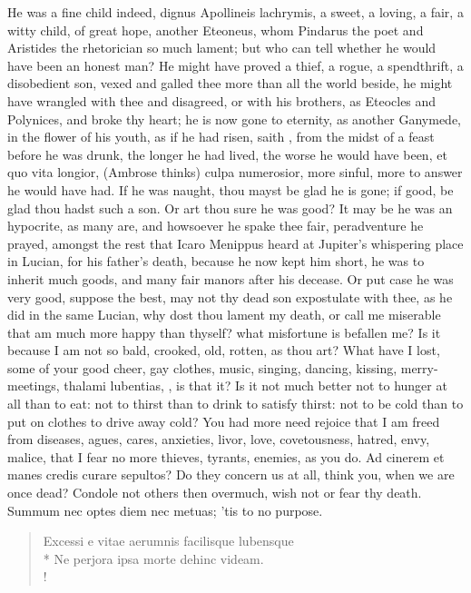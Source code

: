 {He was a fine child indeed, dignus Apollineis lachrymis, a sweet, a
loving, a fair, a witty child, of great hope, another Eteoneus, whom
Pindarus the poet and Aristides the rhetorician so much lament; but who
can tell whether he would have been an honest man? He might have proved
a thief, a rogue, a spendthrift, a disobedient son, vexed and galled
thee more than all the world beside, he might have wrangled with thee
and disagreed, or with his brothers, as Eteocles and Polynices, and
broke thy heart; he is now gone to eternity, as another Ganymede, in
the flower of his youth, as if he had risen, saith
\Plutarch, from the midst of a feast before he was drunk, the
longer he had lived, the worse he would have been, et quo vita longior,
(Ambrose thinks) culpa numerosior, more sinful, more to answer he would
have had. If he was naught, thou mayst be glad he is gone; if good, be
glad thou hadst such a son. Or art thou sure he was good? It may be he
was an hypocrite, as many are, and howsoever he spake thee fair,
peradventure he prayed, amongst the rest that Icaro Menippus heard at
Jupiter's whispering place in Lucian, for his father's death, because
he now kept him short, he was to inherit much goods, and many fair
manors after his decease. Or put case he was very good, suppose the
best, may not thy dead son expostulate with thee, as he did in the same
Lucian, why dost thou lament my death, or call me miserable that
am much more happy than thyself? what misfortune is befallen me? Is it
because I am not so bald, crooked, old, rotten, as thou art? What have
I lost, some of your good cheer, gay clothes, music, singing, dancing,
kissing, merry-meetings, thalami lubentias, \etc{}, is that it? Is it not
much better not to hunger at all than to eat: not to thirst than to
drink to satisfy thirst: not to be cold than to put on clothes to drive
away cold? You had more need rejoice that I am freed from diseases,
agues, cares, anxieties, livor, love, covetousness, hatred, envy,
malice, that I fear no more thieves, tyrants, enemies, as you do.
Ad cinerem et manes credis curare sepultos? Do they concern us at
all, think you, when we are once dead? Condole not others then
overmuch, wish not or fear thy death.  Summum nec optes diem nec
metuas; 'tis to no purpose.
%
\begin{latin}%
\begin{verse}%
Excessi e vitae aerumnis facilisque lubensque\\*
Ne perjora ipsa morte dehinc videam.\\!

\end{verse}
\end{latin}}

